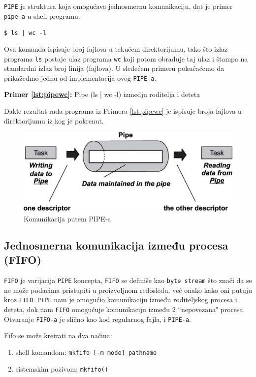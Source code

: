 \documentclass[a4paper, 11pt, twoside]{article}
\newcommand{\scode}[3] {
	\hspace{.06\textwidth} 
	\begin{minipage}[t]{.88\textwidth} %
		\begin{mdframed}[topline=true,bottomline=true,leftline=true,rightline=true,backgroundcolor=gray!22, linecolor=gray!60!black,roundcorner=1mm]
			 

	\begin{center}
		\caption{\textbf{Primer \ref{lst:#3}:} #2}
	\end{center}
	\end{mdframed}
	\end{minipage}

}
\begin{document}
\texttt{PIPE} je struktura koja omogućava jednosmernu komunikaciju, dat je primer \texttt{pipe-a} u shell programu: 

\begin{center}
	\texttt{\$ ls | wc -l}  
\end{center}

Ova komanda ispisuje broj fajlova u tekućem direktorijumu, tako što izlaz programa \texttt{ls} postaje ulaz programa \texttt{wc} koji potom obrađuje taj ulaz i štampa na standardni izlaz broj linija (fajlova).
U sledećem primeru pokučaćemo da prikažedmo jednu od implementacija ovog \texttt{PIPE-a}.

\scode{pipe.c}{Pipe (ls | wc -l) izmedju roditelja i deteta}{pipewc}
\vspace{3mm} 

Dakle rezultat rada programa iz Primera \ref{lst:pipewc} je ispisuje broja fajlova u direktorijumu iz kog je pokrenut.
\newpage

\begin{figure}[h]
	\centering
	\vspace{3mm} 
	\includegraphics[width=.65\textwidth]{pipe.jpg} %
	\caption{Komunikacija putem PIPE-a}
	\label{fig:lpipe}
\end{figure}

\subsection{Jednosmerna komunikacija između procesa (FIFO)}

\texttt{FIFO} je varijacija \texttt{PIPE} koncepta, \texttt{FIFO} se definiše kao \texttt{byte stream} što znači da se ne može podacima pristupiti u proizvoljnom redosledu, već onako kako oni putuju kroz \texttt{FIFO}. \texttt{PIPE} nam je omogućio komunikaciju između roditeljskog procesa i deteta, dok nam \texttt{FIFO} omogućuje komunikaciju između 2 ``nepovezana" procesa. Otvaranje \texttt{FIFO-a} je slično kao kod regularnog fajla, i \texttt{PIPE-a}. 

Fifo se može kreirati na dva načina:
\vspace{-2mm} 
\begin{enumerate}[1)]
	\item{shell komandom: \texttt{mkfifo [-m mode] pathname}}
	\item{sistemskim pozivom: \texttt{mkfifo()}}
\end{enumerate}
\end{document}
